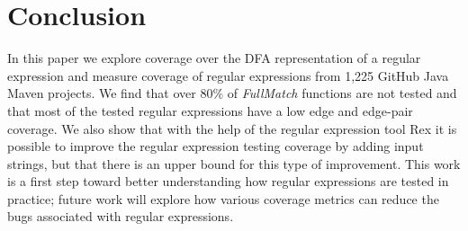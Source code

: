 \section{Conclusion}
\label{sec:conclusion}
In this paper we explore coverage over the DFA representation of a regular expression and measure  coverage of regular expressions from 1,225 GitHub Java Maven projects. We find that over 80\% of {\em FullMatch} functions are not tested and that most of the tested regular expressions have a low edge and edge-pair coverage. 
We also show that with the help of the regular expression tool Rex it is possible to improve the regular expression testing coverage by adding input strings, but that there is an upper bound for this type of improvement. 
This work is a first step toward better understanding how regular expressions are tested in practice; future work will explore how various coverage metrics can reduce the bugs associated with regular expressions. %



